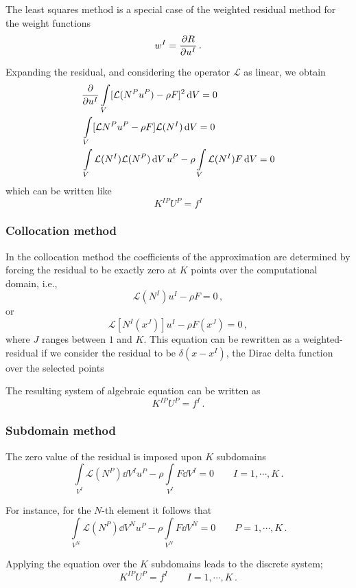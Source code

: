 The least squares method is a special case of the weighted residual method for the weight functions
\[w^I = \pdv{R}{u^I}\, .\]

Expanding the residual, and considering the operator $\mathcal{L}$ as linear, we obtain
\begin{align*}
  &\pdv{u^I}\int\limits_V [\mathcal{L}(N^P u^P) - \rho F]^2 \dd{V} = 0\\
  &\int\limits_V [\mathcal{L} N^P u^P - \rho F] \mathcal{L}(N^I) \dd{V} = 0\\
 &\int\limits_V \mathcal{L}(N^I) \mathcal{L}(N^P) \dd{V} u^P - \rho \int\limits_V \mathcal{L}(N^I) F \dd{V} = 0
\end{align*}
which can be written like
\begin{equation}
  K^{IP} U^P = f^I
  \label{eq:Dsquares}
\end{equation}

\subsubsection{Collocation method}
In the collocation method the coefficients of the approximation are determined by forcing the residual to be exactly zero at $K$ points over the computational domain, i.e.,
\[\mathcal{L}(N^I) u^I - \rho F = 0\, ,\]
or
\[\mathcal{L}[N^I(x^J)] u^I - \rho F(x^J) = 0\, ,\]
where $J$ ranges between $1$ and $K$. This equation can be rewritten as a weighted-residual if we consider the residual to be $\delta(x - x^I)$, the Dirac delta function over the selected points

The resulting system of algebraic equation can be written as
\begin{equation}
K^{IP} U^P = f^I\, .
\label{eq:Colo}
\end{equation}

\subsubsection{Subdomain method}
The zero value of the residual is imposed upon $K$ subdomains
\[\int\limits_{V^I} \mathcal{L}(N^P)\dd{V^I} u^P  - \rho \int\limits_{V^I}  F\dd{V^I}  = 0 \qquad I=1,\cdots,K\, .\]

For instance, for the $N$-th element it follows that
\[\int\limits_{V^N} \mathcal{L}(N^P)\dd{V^N} u^P  - \rho \int\limits_{V^N} F\dd{V^N}  = 0 \qquad P=1,\cdots,K\, .\]

Applying the equation over the $K$ subdomains leads to the discrete system;
\begin{equation}
K^{IP} U^P = f^I \quad \quad I=1,\cdots,K\, .
\label{eq:Subdomain}
\end{equation}

